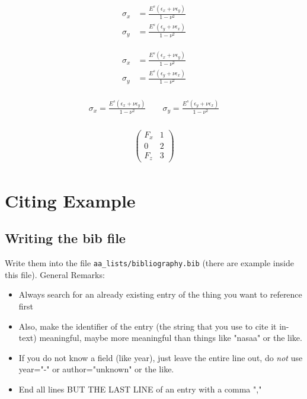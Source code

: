 \begin{align} \label{eq:CHANGETHIS}
    \sigma_x &= \frac{E^s(\epsilon_x+\nu\epsilon_y)}{1-\nu^2} \\
    \sigma_y &= \frac{E^s(\epsilon_y+\nu\epsilon_x)}{1-\nu^2}
\end{align}




\begin{align} \label{eq:CHANGETHIS}
    \begin{split}
        \sigma_x &= \frac{E^s(\epsilon_x+\nu\epsilon_y)}{1-\nu^2} \\
        \sigma_y &= \frac{E^s(\epsilon_y+\nu\epsilon_x)}{1-\nu^2}
    \end{split}
\end{align}



\begin{align} \label{eq:CHANGETHIS}
    \begin{split}
        \sigma_x = \frac{E^s(\epsilon_x+\nu\epsilon_y)}{1-\nu^2} \quad \quad
        \sigma_y = \frac{E^s(\epsilon_y+\nu\epsilon_x)}{1-\nu^2}
    \end{split}
\end{align}


\begin{align}
    \begin{split}
    \begin{pmatrix}  F_x & 1\\ 0&2\\ F_z&3\end{pmatrix}
    \end{split}
\end{align}



\chapter{Citing Example}

\section{Writing the bib file}

Write them into the file \texttt{aa\_lists/bibliography.bib} (there are example inside this file). General Remarks:

\begin{itemize}
    \item Always search for an already existing entry of the thing you want to reference first
    \item Also, make the identifier of the entry (the string that you use to cite it in-text) meaningful, maybe more meaningful than things like "nasaa" or the like.
    \item If you do not know a field (like year), just leave the entire line out, do \emph{not} use year="-" or author="unknown" or the like.
    \item End all lines BUT THE LAST LINE of an entry with a comma "," 
\end{itemize}

